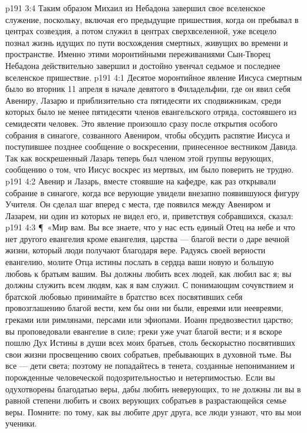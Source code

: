\vs p191 3:4 Таким образом Михаил из Небадона завершил свое вселенское служение, поскольку, включая его предыдущие пришествия, когда он пребывал в центрах созвездия, а потом служил в центрах сверхвселенной, уже всецело познал жизнь идущих по пути восхождения смертных, живущих во времени и пространстве. Именно этими моронтийными переживаниями Сын\hyp{}Творец Небадона действительно завершил и достойно увенчал седьмое и последнее вселенское пришествие.
\vs p191 4:1 Десятое моронтийное явление Иисуса смертным было во вторник 11 апреля в начале девятого в Филадельфии, где он явил себя Авениру, Лазарю и приблизительно ста пятидесяти их сподвижникам, среди которых было не менее пятидесяти членов евангельского отряда, состоявшего из семидесяти человек. Это явление произошло сразу после открытия особого собрания в синагоге, созванного Авениром, чтобы обсудить распятие Иисуса и поступившее позднее сообщение о воскресении, принесенное вестником Давида. Так как воскрешенный Лазарь теперь был членом этой группы верующих, сообщению о том, что Иисус воскрес из мертвых, им было поверить не трудно.
\vs p191 4:2 Авенир и Лазарь, вместе стоявшие на кафедре, как раз открывали собрание в синагоге, когда все верующие увидели внезапно появившуюся фигуру Учителя. Он сделал шаг вперед с места, где появился между Авениром и Лазарем, ни один из которых не видел его, и, приветствуя собравшихся, сказал:
\vs p191 4:3 \P\ «Мир вам. Вы все знаете, что у нас есть единый Отец на небе и что нет другого евангелия кроме евангелия, царства --- благой вести о даре вечной жизни, который люди получают благодаря вере. Радуясь своей верности евангелию, молите Отца истины послать в сердца ваши новую и большую любовь к братьям вашим. Вы должны любить всех людей, как любил вас я; вы должны служить всем людям, как я вам служил. С понимающим сочувствием и братской любовью принимайте в братство всех посвятивших себя провозглашению благой вести, кем бы они ни были, евреями или неевреями, греками или римлянами, персами или эфиопами. Иоанн предвозвестил царство; вы проповедовали евангелие в силе; греки уже учат благой вести; и я вскоре пошлю Дух Истины в души всех моих братьев, столь бескорыстно посвятивших свои жизни просвещению своих собратьев, пребывающих в духовной тьме. Вы все --- дети света; поэтому не попадайтесь в тенета, созданные непониманием и порожденные человеческой подозрительностью и нетерпимостью. Если вы одухотворены благодатью веры, дабы любить неверующих, то не должны ли вы в равной степени любить и своих верующих собратьев в разрастающейся семье веры. Помните: по тому, как вы любите друг друга, все люди узнают, что вы мои ученики.
